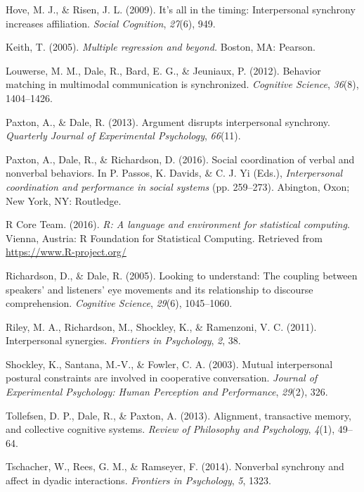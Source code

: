 \documentclass[10pt, letterpaper]{article}
\begin{document}
\hypertarget{ref-hove2009s}{}
Hove, M. J., \& Risen, J. L. (2009). It's all in the timing:
Interpersonal synchrony increases affiliation. \emph{Social Cognition},
\emph{27}(6), 949.

\hypertarget{ref-keith2005multiple}{}
Keith, T. (2005). \emph{Multiple regression and beyond.} Boston, MA:
Pearson.

\hypertarget{ref-louwerse2012behavior}{}
Louwerse, M. M., Dale, R., Bard, E. G., \& Jeuniaux, P. (2012). Behavior
matching in multimodal communication is synchronized. \emph{Cognitive
Science}, \emph{36}(8), 1404--1426.

\hypertarget{ref-paxton2013argument}{}
Paxton, A., \& Dale, R. (2013). Argument disrupts interpersonal
synchrony. \emph{Quarterly Journal of Experimental Psychology},
\emph{66}(11).

\hypertarget{ref-paxton2016social}{}
Paxton, A., Dale, R., \& Richardson, D. (2016). Social coordination of
verbal and nonverbal behaviors. In P. Passos, K. Davids, \& C. J. Yi
(Eds.), \emph{Interpersonal coordination and performance in social
systems} (pp. 259--273). Abington, Oxon; New York, NY: Routledge.

\hypertarget{ref-r2016r}{}
R Core Team. (2016). \emph{R: A language and environment for statistical
computing}. Vienna, Austria: R Foundation for Statistical Computing.
Retrieved from \url{https://www.R-project.org/}

\hypertarget{ref-richardson2005looking}{}
Richardson, D., \& Dale, R. (2005). Looking to understand: The coupling
between speakers' and listeners' eye movements and its relationship to
discourse comprehension. \emph{Cognitive Science}, \emph{29}(6),
1045--1060.

\hypertarget{ref-riley2011interpersonal}{}
Riley, M. A., Richardson, M., Shockley, K., \& Ramenzoni, V. C. (2011).
Interpersonal synergies. \emph{Frontiers in Psychology}, \emph{2}, 38.

\hypertarget{ref-shockley2003mutual}{}
Shockley, K., Santana, M.-V., \& Fowler, C. A. (2003). Mutual
interpersonal postural constraints are involved in cooperative
conversation. \emph{Journal of Experimental Psychology: Human Perception
and Performance}, \emph{29}(2), 326.

\hypertarget{ref-tollefsen2013alignment}{}
Tollefsen, D. P., Dale, R., \& Paxton, A. (2013). Alignment, transactive
memory, and collective cognitive systems. \emph{Review of Philosophy and
Psychology}, \emph{4}(1), 49--64.

\hypertarget{ref-tschacher2014nonverbal}{}
Tschacher, W., Rees, G. M., \& Ramseyer, F. (2014). Nonverbal synchrony
and affect in dyadic interactions. \emph{Frontiers in Psychology},
\emph{5}, 1323.
\end{document}

